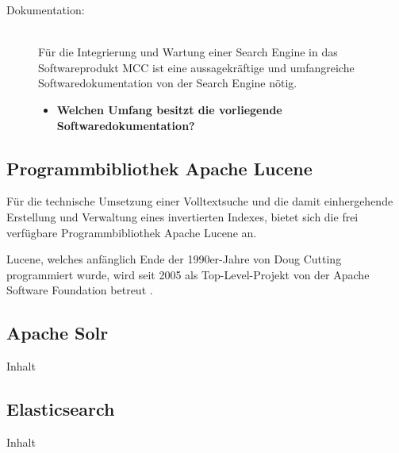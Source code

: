 \begin{description}
    \item[Dokumentation:]\hfill \\
    Für die Integrierung und Wartung einer Search Engine in das Softwareprodukt MCC ist eine aussagekräftige und umfangreiche Softwaredokumentation von der Search Engine nötig.

    \begin{itemize}
        \item \textbf{Welchen Umfang besitzt die vorliegende Softwaredokumentation?}
    \end{itemize}

\end{description}

\subsection{Programmbibliothek \glqq Apache Lucene\grqq{}\label{subsec4.1.1:Unterunterpunkt-1}}

Für die technische Umsetzung einer Volltextsuche und die damit einhergehende Erstellung und Verwaltung eines invertierten Indexes, bietet sich die frei verfügbare Programmbibliothek \glqq Apache Lucene\grqq{} an.

Lucene, welches anfänglich Ende der 1990er-Jahre von Doug Cutting programmiert wurde, wird seit 2005 als Top-Level-Projekt von der Apache Software Foundation betreut \cite{StefanLuber.2018}.


\subsection{Apache Solr\label{subsec4.2.2:Unterunterpunkt-2}}

Inhalt

\subsection{Elasticsearch\label{subsec4.2.3:Unterunterpunkt-3}}

Inhalt


